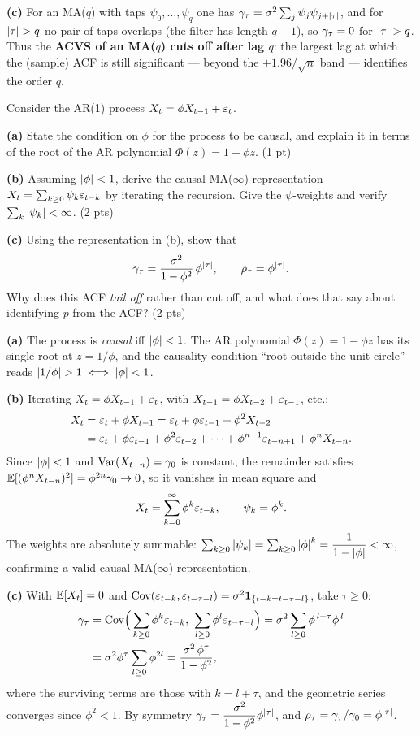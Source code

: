 \documentclass[11pt]{article}
\begin{document}
\textbf{(c)} For an MA($q$) with taps $\psi_0,\dots,\psi_q$ one has $\gamma_\tau=\sigma^2\sum_{j}\psi_j\psi_{j+\left\lvert \tau \right\rvert}$, and for $\left\lvert \tau \right\rvert>q$ no pair of taps overlaps (the filter has length $q+1$), so $\gamma_\tau=0$ for $\left\lvert \tau \right\rvert>q$. Thus the \textbf{ACVS of an MA($q$) cuts off after lag $q$}: the largest lag at which the (sample) ACF is still significant --- beyond the $\pm1.96/\sqrt n$ band --- identifies the order $q$.

\statementstart
Consider the AR(1) process $X_t=\phi X_{t-1}+\varepsilon_t$.

\textbf{(a)} State the condition on $\phi$ for the process to be causal, and explain it in terms of the root of the AR polynomial $\Phi(z)=1-\phi z$. \hfill(1 pt)

\textbf{(b)} Assuming $\left\lvert \phi \right\rvert<1$, derive the causal MA($\infty$) representation $X_t=\sum_{k\ge0}\psi_k\varepsilon_{t-k}$ by iterating the recursion. Give the $\psi$-weights and verify $\sum_k\left\lvert \psi_k \right\rvert<\infty$. \hfill(2 pts)

\textbf{(c)} Using the representation in (b), show that
\[
\gamma_\tau=\frac{\sigma^2}{1-\phi^2}\,\phi^{\left\lvert \tau \right\rvert},
\qquad
\rho_\tau=\phi^{\left\lvert \tau \right\rvert}.
\]
Why does this ACF \emph{tail off} rather than cut off, and what does that say about identifying $p$ from the ACF? \hfill(2 pts)
\statementend

\textbf{(a)} The process is \emph{causal} iff $\left\lvert \phi \right\rvert<1$. The AR polynomial $\Phi(z)=1-\phi z$ has its single root at $z=1/\phi$, and the causality condition ``root outside the unit circle'' reads $\left\lvert 1/\phi \right\rvert>1\iff\left\lvert \phi \right\rvert<1$.

\textbf{(b)} Iterating $X_t=\phi X_{t-1}+\varepsilon_t$, with $X_{t-1}=\phi X_{t-2}+\varepsilon_{t-1}$, etc.:
\[
\begin{aligned}
X_t&=\varepsilon_t+\phi X_{t-1}
   =\varepsilon_t+\phi\varepsilon_{t-1}+\phi^2 X_{t-2}\\
   &=\varepsilon_t+\phi\varepsilon_{t-1}+\phi^2\varepsilon_{t-2}+\cdots+\phi^{n-1}\varepsilon_{t-n+1}+\phi^{n}X_{t-n}.
\end{aligned}
\]
Since $\left\lvert \phi \right\rvert<1$ and $\operatorname{Var}(X_{t-n})=\gamma_0$ is constant, the remainder satisfies $\mathbb{E}[(\phi^n X_{t-n})^2]=\phi^{2n}\gamma_0\to0$, so it vanishes in mean square and
\[
X_t=\sum_{k=0}^{\infty}\phi^{k}\varepsilon_{t-k},
\qquad \psi_k=\phi^k.
\]
The weights are absolutely summable: $\sum_{k\ge0}\left\lvert \psi_k \right\rvert=\sum_{k\ge0}\left\lvert \phi \right\rvert^{k}=\dfrac{1}{1-\left\lvert \phi \right\rvert}<\infty$, confirming a valid causal MA($\infty$) representation.

\textbf{(c)} With $\mathbb{E}[X_t]=0$ and $\operatorname{Cov}(\varepsilon_{t-k},\varepsilon_{t-\tau-l})=\sigma^2\mathbf{1}_{\{t-k=t-\tau-l\}}$, take $\tau\ge0$:
\[
\begin{aligned}
\acvs_\tau
&=\Cov\!\Big(\sum_{k\ge0}\phi^{k}\eps_{t-k},\ \sum_{l\ge0}\phi^{l}\eps_{t-\tau-l}\Big)
 =\sigma^2\sum_{l\ge0}\phi^{\,l+\tau}\phi^{\,l}\\
&=\sigma^2\phi^{\tau}\sum_{l\ge0}\phi^{2l}
 =\frac{\sigma^2\,\phi^{\tau}}{1-\phi^2},
\end{aligned}
\]
where the surviving terms are those with $k=l+\tau$, and the geometric series converges since $\phi^2<1$. By symmetry $\gamma_\tau=\dfrac{\sigma^2}{1-\phi^2}\phi^{\left\lvert \tau \right\rvert}$, and $\rho_\tau=\gamma_\tau/\gamma_0=\phi^{\left\lvert \tau \right\rvert}$.
\end{document}
